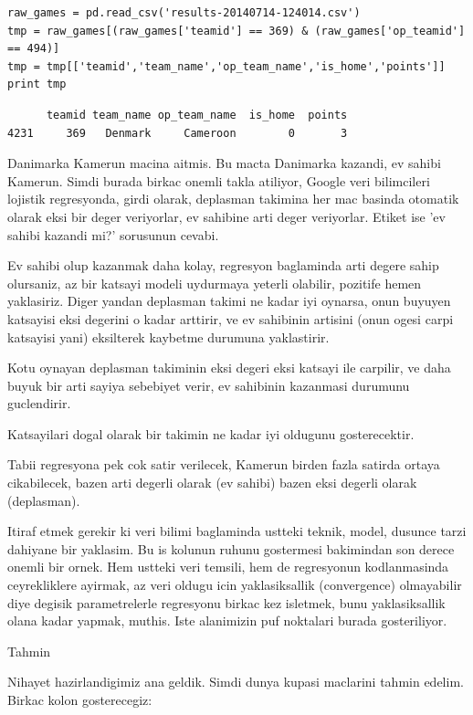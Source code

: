 \documentclass[12pt,fleqn]{article}\usepackage{../common}
\begin{document}
\begin{verbatim}
raw_games = pd.read_csv('results-20140714-124014.csv')
tmp = raw_games[(raw_games['teamid'] == 369) & (raw_games['op_teamid'] == 494)]
tmp = tmp[['teamid','team_name','op_team_name','is_home','points']]
print tmp
\end{verbatim}

\begin{verbatim}
      teamid team_name op_team_name  is_home  points
4231     369   Denmark     Cameroon        0       3
\end{verbatim}

Danimarka Kamerun macina aitmis. Bu macta Danimarka kazandi, ev sahibi
Kamerun. Simdi burada birkac onemli takla atiliyor, Google veri bilimcileri
lojistik regresyonda, girdi olarak, deplasman takimina her mac basinda
otomatik olarak eksi bir deger veriyorlar, ev sahibine arti deger
veriyorlar. Etiket ise 'ev sahibi kazandi mi?' sorusunun cevabi.

Ev sahibi olup kazanmak daha kolay, regresyon baglaminda arti degere sahip
olursaniz, az bir katsayi modeli uydurmaya yeterli olabilir, pozitife hemen
yaklasiriz. Diger yandan deplasman takimi ne kadar iyi oynarsa, onun buyuyen
katsayisi eksi degerini o kadar arttirir, ve ev sahibinin artisini (onun
ogesi carpi katsayisi yani) eksilterek kaybetme durumuna yaklastirir.

Kotu oynayan deplasman takiminin eksi degeri eksi katsayi ile carpilir, ve
daha buyuk bir arti sayiya sebebiyet verir, ev sahibinin kazanmasi durumunu
guclendirir. 

Katsayilari dogal olarak bir takimin ne kadar iyi oldugunu gosterecektir. 

Tabii regresyona pek cok satir verilecek, Kamerun birden fazla satirda
ortaya cikabilecek, bazen arti degerli olarak (ev sahibi) bazen eksi
degerli olarak (deplasman). 

Itiraf etmek gerekir ki veri bilimi baglaminda ustteki teknik, model,
dusunce tarzi dahiyane bir yaklasim. Bu is kolunun ruhunu gostermesi
bakimindan son derece onemli bir ornek. Hem ustteki veri temsili, hem de
regresyonun kodlanmasinda ceyrekliklere ayirmak, az veri oldugu icin
yaklasiksallik (convergence) olmayabilir diye degisik parametrelerle
regresyonu birkac kez isletmek, bunu yaklasiksallik olana kadar yapmak,
muthis. Iste alanimizin puf noktalari burada gosteriliyor.

Tahmin

Nihayet hazirlandigimiz ana geldik. Simdi dunya kupasi maclarini tahmin
edelim. Birkac kolon gosterecegiz:
\end{document}
